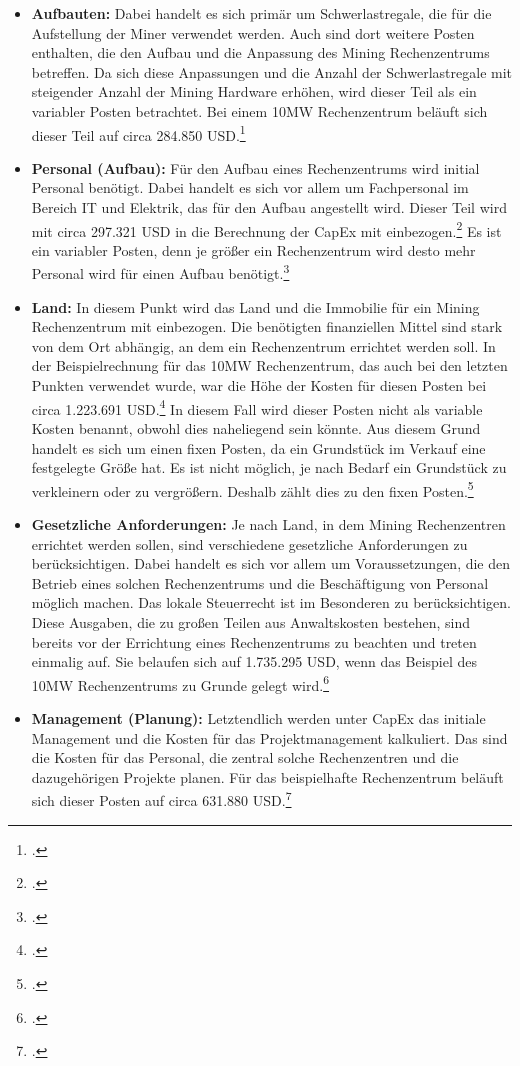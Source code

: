 \begin{itemize}
    \item \textbf{Aufbauten: }Dabei handelt es sich primär um Schwerlastregale, die für die Aufstellung der Miner verwendet
    werden. Auch sind dort weitere Posten enthalten, die den Aufbau und die Anpassung des Mining Rechenzentrums betreffen. Da sich
    diese Anpassungen und die Anzahl der Schwerlastregale mit steigender Anzahl der Mining Hardware erhöhen, wird dieser
    Teil als ein variabler Posten betrachtet. Bei einem 10MW Rechenzentrum beläuft sich dieser Teil auf circa 284.850
    USD.\footcite[Cf.][]{appendix:capex}
    \item \textbf{Personal (Aufbau): }Für den Aufbau eines Rechenzentrums wird initial Personal benötigt. Dabei handelt es
    sich vor allem um Fachpersonal im Bereich IT und Elektrik, das für den Aufbau angestellt wird. Dieser Teil wird mit circa
    297.321 \ac{USD} in die Berechnung der \ac{CapEx} mit einbezogen.\footcite[Cf.][]{appendix:capex} Es ist ein variabler
    Posten, denn je größer ein Rechenzentrum wird desto mehr Personal wird für einen Aufbau benötigt.\footcite[Cf.][]{appendix:capex}
    \item \textbf{Land: }In diesem Punkt wird das Land und die Immobilie für ein Mining Rechenzentrum mit einbezogen. Die
    benötigten finanziellen Mittel sind stark von dem Ort abhängig, an dem ein Rechenzentrum errichtet werden soll. In der
    Beispielrechnung für das 10MW Rechenzentrum, das auch bei den letzten Punkten verwendet wurde, war die Höhe der Kosten
    für diesen Posten bei circa 1.223.691 \ac{USD}.\footcite[Cf.][]{appendix:capex} In diesem Fall wird dieser Posten nicht
    als variable Kosten benannt, obwohl dies naheliegend sein könnte. Aus diesem Grund handelt es sich um einen fixen Posten,
    da ein Grundstück im Verkauf eine festgelegte Größe hat. Es ist nicht möglich, je nach Bedarf ein Grundstück zu verkleinern
    oder zu vergrößern. Deshalb zählt dies zu den fixen Posten.\footcite[Cf.][]{appendix:capex}
    \item \textbf{Gesetzliche Anforderungen: }Je nach Land, in dem Mining Rechenzentren errichtet werden sollen, sind
    verschiedene gesetzliche Anforderungen zu berücksichtigen. Dabei handelt es sich vor allem um Voraussetzungen, die den
    Betrieb eines solchen Rechenzentrums und die Beschäftigung von Personal möglich machen. Das lokale Steuerrecht ist im
    Besonderen zu berücksichtigen. Diese Ausgaben, die zu großen Teilen aus Anwaltskosten bestehen, sind bereits vor der
    Errichtung eines Rechenzentrums zu beachten und treten einmalig auf. Sie belaufen sich auf 1.735.295 \ac{USD}, wenn
    das Beispiel des 10MW Rechenzentrums zu Grunde gelegt wird.\footcite[Cf.][]{appendix:capex}
    \item \textbf{Management (Planung): }Letztendlich werden unter \ac{CapEx} das initiale Management und die Kosten für
    das Projektmanagement kalkuliert. Das sind die Kosten für das Personal, die zentral solche Rechenzentren und die
    dazugehörigen Projekte planen. Für das beispielhafte Rechenzentrum beläuft sich dieser Posten auf circa
    631.880 USD.\footcite[Cf.][]{appendix:capex}
\end{itemize}

